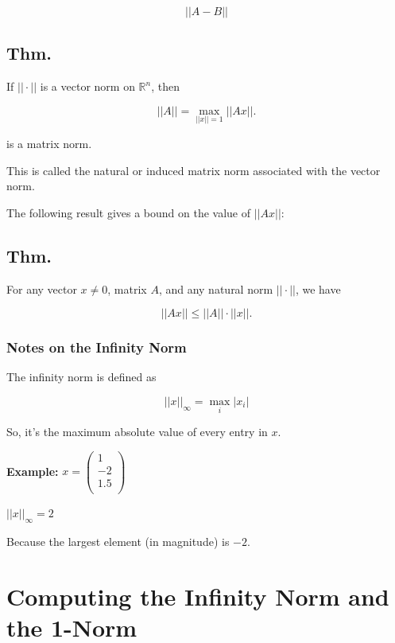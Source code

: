 \begin{equation*}
  ||A-B||
\end{equation*}

\subsection{Thm.}

If $||\cdot||$ is a vector norm on $\mathbb{R}^n $, then 

\begin{equation*}
  ||A|| = \max_{||x||=1} ||Ax||.
\end{equation*}

is a matrix norm.

This is called the natural or induced matrix norm associated with the vector
norm.

The following result gives a bound on the value of $||Ax||$:

\subsection{Thm.}

For any vector $x\ne 0$, matrix $A$, and any natural norm $||\cdot||$, we have

\begin{equation*}
  ||Ax|| \leq ||A|| \cdot ||x||.
\end{equation*}

\subsubsection{Notes on the Infinity Norm}

The infinity norm is defined as

\begin{equation*}
  ||x||_\infty = \max_{i} |x_i|
\end{equation*}

So, it's the maximum absolute value of every entry in $x$.

\textbf{Example:} $x=\left(\begin{array}{c}
  1 \\
  -2 \\
  1.5 \\
\end{array}\right)$

$||x||_\infty = 2$

Because the largest element (in magnitude) is $-2$.

\section{Computing the Infinity Norm and the 1-Norm}

